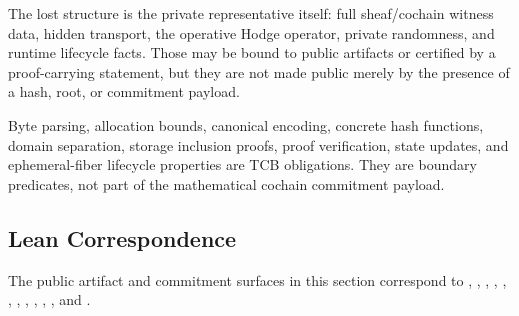The lost structure is the private representative itself: full sheaf/cochain
witness data, hidden transport, the operative Hodge operator, private
randomness, and runtime lifecycle facts. Those may be bound to public artifacts
or certified by a proof-carrying statement, but they are not made public merely
by the presence of a hash, root, or commitment payload.

Byte parsing, allocation bounds, canonical encoding, concrete hash functions,
domain separation, storage inclusion proofs, proof verification, state updates,
and ephemeral-fiber lifecycle properties are TCB obligations. They are boundary
predicates, not part of the mathematical cochain commitment payload.

\subsection*{Lean Correspondence}

The public artifact and commitment surfaces in this section correspond to
,
,
,
,
,
,
,
,
,
,
, and
.
